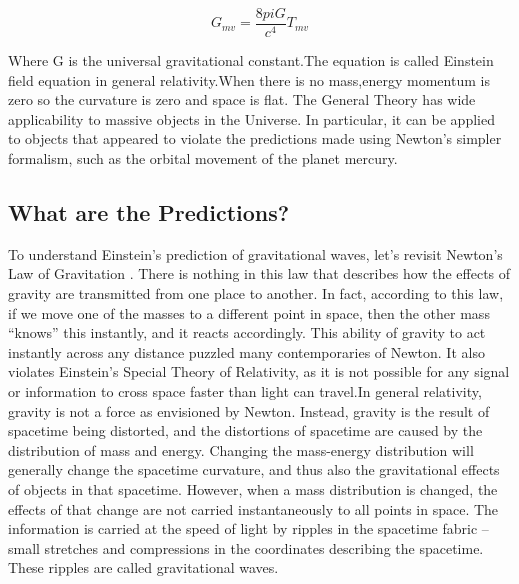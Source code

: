 \begin{equation}
	G_{mv}=\frac{8piG}{c^4}T_{mv}
\end{equation}


Where G is the universal gravitational constant.The equation is called Einstein field 
equation in general relativity.When there is no mass,energy momentum is zero so the 
curvature is zero and space is flat. The General Theory has wide applicability to massive objects in the 
Universe. In particular, it can be applied to objects that appeared to violate the predictions 
made using Newton’s simpler formalism, such as the orbital movement of the planet 
mercury.



\subsection*{What are the Predictions?}

To understand Einstein’s prediction of gravitational waves, let’s revisit Newton’s Law of 
Gravitation . There is nothing in this law that describes how the effects of gravity are 
transmitted from one place to another. In fact, according to this law, if we move one of the 
masses to a different point in space, then the other mass “knows” this instantly, and it reacts 
accordingly. This ability of gravity to act instantly across any distance puzzled many 
contemporaries of Newton. It also violates Einstein’s Special Theory of Relativity, as it is 
not possible for any signal or information to cross space faster than light can travel.In
general relativity, gravity is not a force as envisioned by Newton. Instead, gravity is the
result of spacetime being distorted, and the distortions of spacetime are caused by
the distribution of mass and energy. Changing the mass-energy distribution will generally
change the spacetime curvature, and thus also the gravitational effects of objects in
that spacetime. However, when a mass distribution is changed, the effects of that change
are not carried instantaneously to all points in space. The information is carried at the speed
of light by ripples in the spacetime fabric – small stretches and compressions in the
coordinates describing the spacetime. These ripples are called gravitational waves. 


